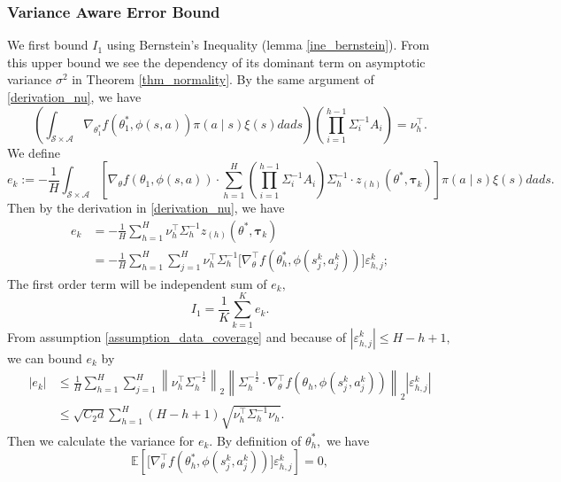 \documentclass{article}
\numberwithin{equation}{section}
\theoremstyle{plain}
\theoremstyle{definition}
\theoremstyle{remark}
\begin{document}
\subsubsection{Variance Aware Error Bound}
We first bound $I_1$ using Bernstein's Inequality (lemma \ref{ine_bernstein}). From this upper bound we see the dependency of its dominant term on asymptotic variance $\sigma^2$ in Theorem \ref{thm_normality}. By the same argument of \eqref{derivation_nu}, we have
\begin{equation*}
    \left(\int_{\mathcal{S} \times \mathcal{A}} \nabla_{\theta_{1}^{*}} f\left(\theta_{1}^{*}, \phi(s, a)\right) \pi(a \mid s) \xi(s) d a d s\right)\left(\prod_{i=1}^{h-1} \Sigma_{i}^{-1} A_{i}\right) = \nu_h^{\top}.
\end{equation*}
We define
\begin{equation*}
    e_k := - \frac{1}{H} \int_{\mathcal{S} \times \mathcal{A}} \left[\nabla_{\theta} f(\theta_1,\phi(s,a)) \cdot \sum_{h=1}^H \left(\prod_{i=1}^{h-1} \Sigma_{i}^{-1} A_i\right) \Sigma^{-1}_h \cdot z_{(h)}(\theta^*,\boldsymbol{\tau}_k) \right] \pi(a \mid s)\xi(s) d a d s.
\end{equation*}
Then by the derivation in \eqref{derivation_nu}, we have
\begin{align*}
    e_k 
    &= - \frac{1}{H} \sum_{h=1}^H \nu_h^{\top} \Sigma_h^{-1} z_{(h)}(\theta^*,\boldsymbol{\tau}_k) \\
    &= - \frac{1}{H} \sum_{h=1}^H \sum_{j=1}^H \nu_h^{\top} \Sigma_h^{-1} \bigg[\nabla_{\theta}^{\top} f(\theta_h^*,\phi(s_j^k,a_j^k))\bigg] \varepsilon_{h,j}^k;
\end{align*}
The first order term will be independent sum of $e_k,$ 
$$
I_1 = \frac{1}{K} \sum_{k=1}^K e_k.
$$
From assumption \ref{assumption_data_coverage} and because of $\left|\varepsilon_{h,j}^k\right| \leq H - h + 1,$ we can bound $e_k$ by
\begin{align*}
    \left|e_k\right|
    & \leq \frac{1}{H} \sum_{h=1}^H \sum_{j=1}^H  \left\|\nu_h^{\top} \Sigma_h^{-\frac{1}{2}}\right\|_2 \left\|\Sigma_h^{-\frac{1}{2}} \cdot \nabla_{\theta}^{\top} f(\theta_h,\phi(s_j^k,a_j^k)) \right\|_2 \left|\varepsilon_{h,j}^k \right| \\
    & \leq \sqrt{C_2 d} \sum_{h=1}^H (H-h+1) \sqrt{\nu_h^{\top} \Sigma_h^{-1} \nu_h}.
\end{align*}
Then we calculate the variance for $e_k.$ By definition of $\theta_h^*,$ we have
\begin{equation*}
    \mathbb{E} \left[\bigg[\nabla_{\theta}^{\top} f(\theta_h^*,\phi(s_j^k,a_j^k))\bigg] \varepsilon_{h,j}^k\right] = 0,
\end{equation*}
\end{document}

